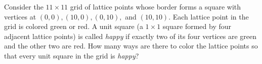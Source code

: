 Consider the $11 \times 11$ grid of lattice points whose border forms a square with vertices at $(0, 0),(10, 0), (0, 10),$ and $(10, 10).$ Each lattice point in the grid is colored green or red. A unit square (a $1 \times 1$ square formed by four adjacent lattice points) is called \emph{happy} if exactly two of its four vertices are green and the other two are red. How many ways are there to color the lattice points so that every unit square in the grid is \emph{happy}?
